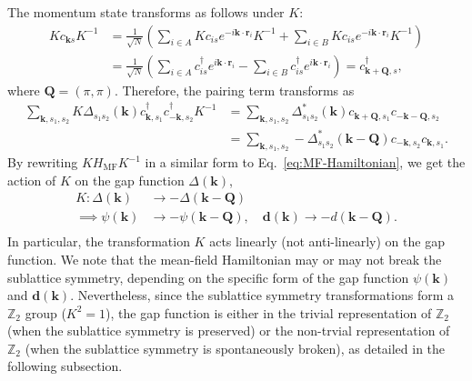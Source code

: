 \documentclass[11pt]{article}
\begin{document}
The momentum state transforms as follows under $K$:
\begin{align}
    K c_{\bm k s} K^{-1} &= \frac{1}{\sqrt{N}} \left(\sum_{i\in A} K c_{i s}
    e^{-i \bm k \cdot \bm r_i} K^{-1}
    + \sum_{i\in B} K c_{i s}e^{-i \bm k \cdot \bm r_i} K^{-1}\right) \nonumber\\
    &= \frac{1}{\sqrt{N}} (\sum_{i\in A} c_{i s}^\dagger
    e^{i \bm k \cdot \bm r_i}
    - \sum_{i\in B} c_{i s}^\dagger e^{i \bm k \cdot \bm r_i})
    =  c_{\bm k + \bm Q,s}^\dagger,
\end{align}
where $\bm Q = (\pi, \pi)$. Therefore, the pairing term transforms as
\begin{align}
    \sum_{\bm k, s_1, s_2} K \Delta_{s_1 s_2}(\bm k)  c^\dagger_{\bm k, s_1}c^\dagger_{-\bm k, s_2} K^{-1}
    &= \sum_{\bm k, s_1, s_2}\Delta_{s_1 s_2}^*(\bm k)
    c_{\bm k + \bm Q, s_1} c_{-\bm k - \bm Q, s_2} \nonumber\\
    &= \sum_{\bm k, s_1, s_2} -{\Delta}_{s_1 s_2}^*(\bm k - \bm Q)
    c_{-\bm k, s_2} c_{\bm k, s_1}.
\end{align}
By rewriting $K H_{\mathrm{MF}} K^{-1}$ in a similar form to Eq.~\eqref{eq:MF-Hamiltonian},
we get the action of $K$ on the gap function $\Delta(\bm k)$,
\begin{equation}\label{eq:action_on_gap}
    \begin{aligned}
        K: \Delta(\bm k) &\to -\Delta(\bm k - \bm Q) \\
        \implies \psi(\bm k) &\to -\psi(\bm k - \bm Q),\quad
        \bm d(\bm k) \to - d(\bm k - \bm Q).\\
    \end{aligned}
\end{equation}
In particular, the transformation $K$ acts linearly (not anti-linearly) on the gap function.
We note that the mean-field Hamiltonian may or may not break the sublattice symmetry,
depending on the specific form of the gap function $\psi(\bm k)$ and $\bm d(\bm k)$.
Nevertheless, since the sublattice symmetry
transformations form a $\mathbb{Z}_2$ group ($K^2 = 1$), the gap function is either in the trivial
representation of $\mathbb{Z}_2$ (when the sublattice symmetry is preserved) or the
non-trvial representation of $\mathbb{Z}_2$ (when the sublattice symmetry is spontaneously broken),
as detailed in the following subsection.
\end{document}
